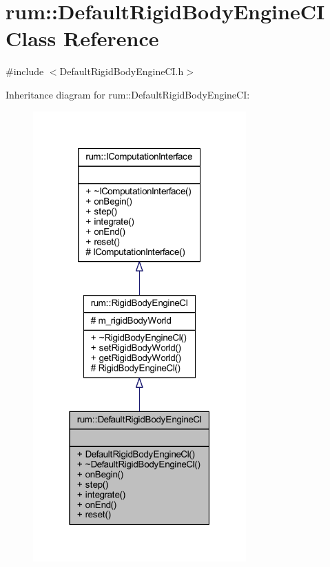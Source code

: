 \hypertarget{classrum_1_1_default_rigid_body_engine_c_i}{}\section{rum\+:\+:Default\+Rigid\+Body\+Engine\+CI Class Reference}
\label{classrum_1_1_default_rigid_body_engine_c_i}


{\ttfamily \#include $<$Default\+Rigid\+Body\+Engine\+C\+I.\+h$>$}



Inheritance diagram for rum\+:\+:Default\+Rigid\+Body\+Engine\+CI\+:\nopagebreak
\begin{figure}[H]
\begin{center}
\leavevmode
\includegraphics[width=232pt]{classrum_1_1_default_rigid_body_engine_c_i__inherit__graph}
\end{center}
\end{figure}


